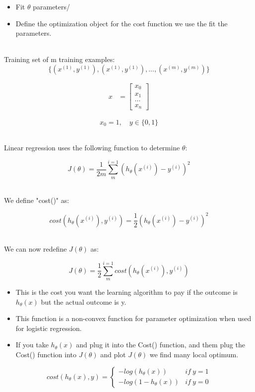 \documentclass{article}
\begin{document}
\begin{itemize}
  \item Fit $\theta$ parameters/
  \item Define the optimization object for the cost function we use the fit the parameters.
\end{itemize}

~\\
Training set of m training examples:
$$\{(x^{(1)}, y^{(1)}), (x^{(1)}, y^{(1)}), ..., (x^{(m)}, y^{(m)})\}$$

\begin{align*}
  x & = \begin{bmatrix}
    x_0 \\
    x_1 \\
    ... \\
    x_n
  \end{bmatrix}
\end{align*}

$$x_0 =1,\quad y \in \{0,1\}$$

~\\
Linear regression uses the following function to determine $\theta$:

$$J(\theta) = \frac{1}{2m} \sum_{m}^{i=1}(h_{\theta}(x^{(i)}) - y^{(i)})^2$$

~\\
We define "cost()" as:

$$cost(h_{\theta}(x^{(i)}), y^{(i)}) = \frac{1}{2} (h_{\theta}(x^{(i)}) - y^{(i)})^2$$

~\\
We can now redefine $J(\theta)$ as:

$$J(\theta) = \frac{1}{2} \sum_{m}^{i=1}cost(h_{\theta}(x^{(i)}), y^{(i)})$$

\begin{itemize}
  \item This is the cost you want the learning algorithm to pay if the outcome is $h_{\theta}(x)$ but the actual outcome is y.
  \item This function is a non-convex function for parameter optimization when used for logistic regression.
  \item If you take $h_{\theta}(x)$ and plug it into the Cost() function, and them plug the Cost() function into $J(\theta)$ and plot $J(\theta)$ we find many local optimum.
\end{itemize}

\[ cost(h_{\theta}(x), y) = \begin{cases}
    -log(h_{\theta}(x))     & if\ y=1 \\
    -log(1 - h_{\theta}(x)) & if\ y=0
  \end{cases}
\]
\end{document}
